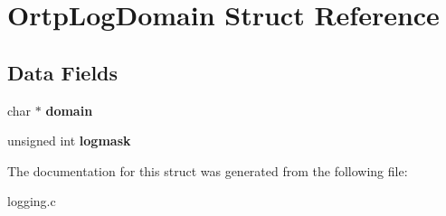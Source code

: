 \section{Ortp\+Log\+Domain Struct Reference}
\label{structOrtpLogDomain}
\subsection*{Data Fields}
\begin{DoxyCompactItemize}
\item 
\mbox{\label{structOrtpLogDomain_a35cb9453b3591182f074151989743505}} 
char $\ast$ {\bfseries domain}
\item 
\mbox{\label{structOrtpLogDomain_adc1fbe67d414da5f59e2cd35a1e1b2f1}} 
unsigned int {\bfseries logmask}
\end{DoxyCompactItemize}


The documentation for this struct was generated from the following file\+:\begin{DoxyCompactItemize}
\item 
logging.\+c\end{DoxyCompactItemize}
